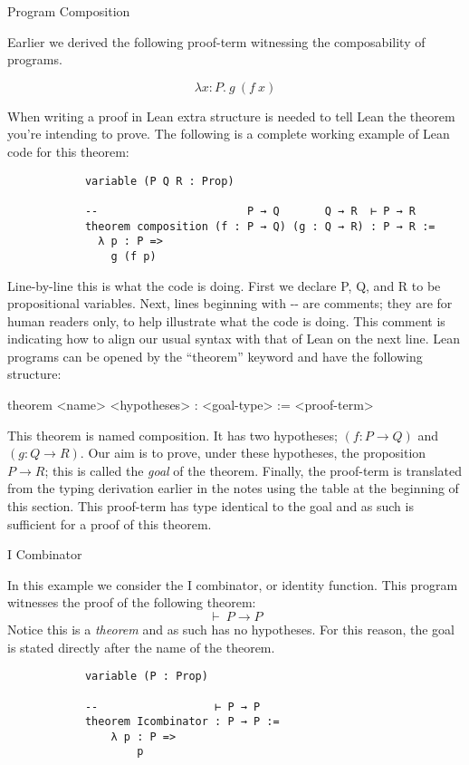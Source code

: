 \documentclass{book}
\begin{document}
    \begin{eg}{Program Composition}

        Earlier we derived the following proof-term witnessing the composability of programs.

        $$ \lambda x : P. \ g \ (f \ x) $$

        When writing a proof in Lean extra structure is needed to tell Lean the theorem you're intending to prove. The following is a complete working example of Lean code for this theorem: 

        \begin{lstlisting}
            variable (P Q R : Prop)
    
            --                       P → Q       Q → R  ⊢ P → R
            theorem composition (f : P → Q) (g : Q → R) : P → R :=
              λ p : P =>
                g (f p)
        \end{lstlisting}
    
        Line-by-line this is what the code is doing. First we declare P, Q, and R to be propositional variables. Next, lines beginning with -{}- are comments; they are for human readers only, to help illustrate what the code is doing. This comment is indicating how to align our usual syntax with that of Lean on the next line. Lean programs can be opened by the ``theorem'' keyword and have the following structure:
        
        \begin{center}
            theorem <name> <hypotheses> : <goal-type> := 
                <proof-term>
        \end{center}

        This theorem is named composition. It has two hypotheses; $(f : P \to Q)$ and $(g : Q \to R)$. Our aim is to prove, under these hypotheses, the proposition $P \to R$; this is called the \emph{goal} of the theorem. Finally, the proof-term is translated from the typing derivation earlier in the notes using the table at the beginning of this section. This proof-term has type identical to the goal and as such is sufficient for a proof of this theorem. 
    \end{eg}

    \begin{eg}{I Combinator}

        In this example we consider the I combinator, or identity function. This program witnesses the proof of the following theorem: $$ \vdash \ P \to P$$
        Notice this is a \emph{theorem} and as such has no hypotheses. For this reason, the goal is stated directly after the name of the theorem.

        \begin{lstlisting}
            variable (P : Prop)
            
            --                  ⊢ P → P
            theorem Icombinator : P → P :=
                λ p : P =>
                    p
        \end{lstlisting}  
        
    \end{eg}
\end{document}
